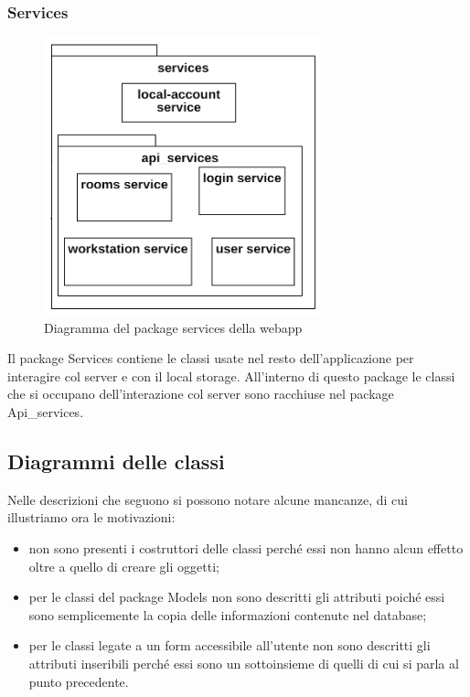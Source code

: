 \subsubsection{Services}
\begin{figure}[H]
	\centering
	\includegraphics[width=8cm]{res/images/webapp-services-diagrammaPackage.png}
	\caption{Diagramma del package services della webapp}
	\label{fig:DiagrammaPackageServicesWebapp}
\end{figure}
Il package Services contiene le classi usate nel resto dell'applicazione per interagire col server e con il local storage. All'interno di questo package le classi che si occupano dell'interazione col server sono racchiuse nel package Api\_services.

\subsection{Diagrammi delle classi}
Nelle descrizioni che seguono si possono notare alcune mancanze, di cui illustriamo ora le motivazioni:
\begin{itemize}
	\item non sono presenti i costruttori delle classi perché essi non hanno alcun effetto oltre a quello di creare gli oggetti;
	\item per le classi del package Models non sono descritti gli attributi poiché essi sono semplicemente la copia delle informazioni contenute nel database;
	\item per le classi legate a un form accessibile all'utente non sono descritti gli attributi inseribili perché essi sono un sottoinsieme di quelli di cui si parla al punto precedente.
\end{itemize}

